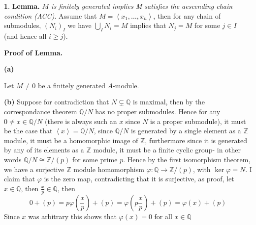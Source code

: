 \documentclass[11pt]{article}
\theoremstyle{definition}
\newtheorem{pb}{}
\newcommand{\gen}[1]{\left\langle #1 \right\rangle}
\begin{document}
    \begin{pb}
        \textbf{Lemma.} \emph{\(M\) is finitely generated implies M satisfies the aescending chain condition (ACC)}. Assume that \(M = \gen{x_1,\hdots,x_n}\), then for any chain of submodules, \((N_i)_I\) we have \(\bigcup_I N_i = M\) implies that \(N_j = M\) for some \(j \in I\) (and hence all \(i \geq j\)).

        \textbf{Proof of Lemma.}

        \textbf{(a)} 
        
        Let \(M \neq 0\) be a finitely generated \(A\)-module.

        \textbf{(b)} Suppose for contradiction that \(N \subsetneq \mathbb{Q}\) is maximal, then by the correspondance theorem \(\mathbb{Q}/N\) has no proper submodules. Hence for any \(0 \neq x \in \mathbb{Q}/N\) (there is always such an \(x\) since \(N\) is a proper submodule), it must be the case that \(\gen{x} = \mathbb{Q}/N\), since \(\mathbb{Q}/N\) is generated by a single element as a \(\mathbb{Z}\) module, it must be a homomorphic image of \(\mathbb{Z}\), furthermore since it is generated by any of its elements as a \(\mathbb{Z}\) module, it must be a finite cyclic group- in other words \(\mathbb{Q}/N \cong \mathbb{Z}/(p)\) for some prime \(p\). Hence by the first isomorphism theorem, we have a surjective \(\mathbb{Z}\) module homomorphism \(\varphi: \mathbb{Q} \to \mathbb{Z}/(p)\), with \(\ker \varphi = N\). I claim that \(\varphi\) is the zero map, contradicting that it is surjective, as proof, let \(x \in \mathbb{Q}\), then \(\frac{x}{p} \in \mathbb{Q}\), then \[0 + (p) = p\varphi(\frac{x}{p}) + (p) = \varphi(p\frac{x}{p}) + (p) = \varphi(x) + (p)\]
        Since \(x\) was arbitrary this shows that \(\varphi(x) = 0\) for all \(x \in \mathbb{Q}\)
    \end{pb}
\end{document}
